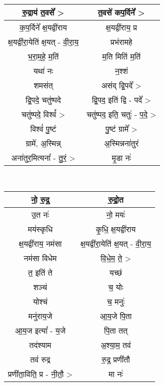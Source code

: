 {\centering
{\small {}} \\
\begin{longtable}{|c|c|}
\hline
रु॒द्राय॑ त॒वसे᳚ >                  & त॒वसे॑ कप॒र्दिने᳚ >\\
\hline
क॒प॒र्दिने᳚ क्ष॒यद्वी॑राय             & क्ष॒यद्वी॑राय॒ प्र\\
\hline
क्ष॒यद्वी॑रा॒येति॑ क्ष॒यत् - वी॒रा॒य॒     & प्रभ॑रामहे\\
\hline
भ॒रा॒म॒हे॒ म॒तिं                    & म॒ति मिति॑ म॒तिं\\
\hline
यथा॑ नः                       & न॒श्शं\\
\hline
शमस॑त्                         & अस॑द् द्वि॒पदे᳚ >\\
\hline
द्वि॒पदे॒ चतु॑ष्पदे                  & द्वि॒पद॒ इति॑ द्वि - पदे᳚ >\\
\hline
चतु॑ष्पदे॒ विश्वं᳚ >                 & चतु॑ष्पद॒ इति॒ चतुः॑ - प॒दे॒ >\\
\hline
विश्वं॑ पु॒ष्टं                     & पु॒ष्टं ग्रामे᳚ >\\
\hline
ग्रामे॑, अ॒स्मिन्न्                  & अ॒स्मिन्नना॑तुरं\\
\hline
अना॑तुर॒मित्यना᳚ - तु॒रं॒ >           & मृ॒डा नः॑\\
\hline
\end{longtable}
}
{\centering
{\small {}} \\
\begin{longtable}{|c|c|}
\hline
नो॒ रु॒द्र॒                       & रु॒द्रो॒त\\
\hline
उ॒त नः॑                        & नो॒ मयः॑\\
\hline
मय॑स्कृधि                       & कृ॒धि॒ क्ष॒यद्वी॑राय\\
\hline
क्ष॒यद्वी॑राय॒ नम॑सा               & क्ष॒यद्वी॑रा॒येति॑ क्ष॒यत् - वी॒रा॒य॒\\
\hline
नम॑सा विधेम                    & वि॒धे॒म॒ ते॒ >\\
\hline
त॒ इति॑ ते                      & यच्छं\\
\hline
शञ्च॑                          & च॒ योः\\
\hline
योश्च॑                         & च॒ मनुः॑\\
\hline
मनु॑राय॒जे                       & आ॒य॒जे पि॒ता\\
\hline
आ॒य॒ज इत्या᳚ - य॒जे                & पि॒ता तत्\\
\hline
तद॑श्याम                       & अ॒श्या॒म॒ तव॑\\
\hline
तव॑ रुद्र                       & रु॒द्र॒ प्रणी॑तौ\\
\hline
प्रणी॑ता॒विति॒ प्र - नी॒तौ॒ >       & मा नः॑\\
\hline
\end{longtable}
}
